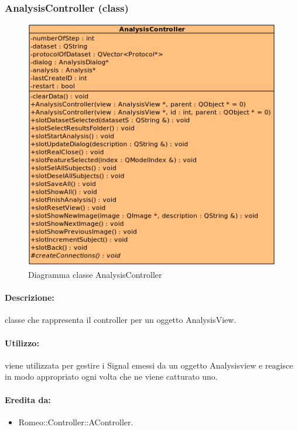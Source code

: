 	\subsubsection{AnalysisController (class)}
	\begin{figure}[!h]
		\centering
		\includegraphics[scale=2.75]{./Content/Immagini/controller/AnalysisController.png}
		\caption{Diagramma classe AnalysisController}
	\end{figure}
	\paragraph{Descrizione:} classe che rappresenta il controller per un oggetto AnalysisView.
	\paragraph{Utilizzo:} viene utilizzata per gestire i Signal\g{} emessi da un oggetto Analysisview e reagisce in modo appropriato ogni volta che ne viene catturato uno.
	\paragraph{Eredita da:}
		\begin{itemize}
			\item Romeo::Controller::AController.
		\end{itemize}

